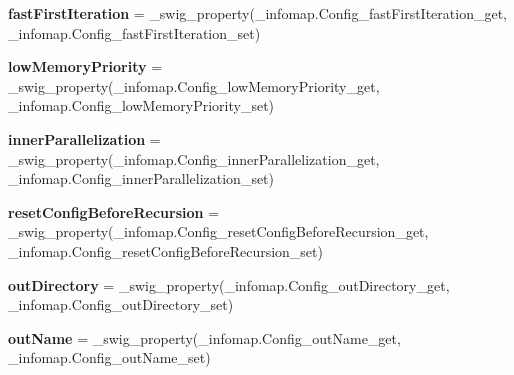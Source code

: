 \begin{DoxyCompactItemize}
\item 
\mbox{\label{classdsmacc_1_1graph_1_1infomap_1_1infomap_1_1Config_a741b590b3ae53b90e9a7013f815ce0cb}} 
{\bfseries fast\+First\+Iteration} = \+\_\+swig\+\_\+property(\+\_\+infomap.\+Config\+\_\+fast\+First\+Iteration\+\_\+get, \+\_\+infomap.\+Config\+\_\+fast\+First\+Iteration\+\_\+set)
\item 
\mbox{\label{classdsmacc_1_1graph_1_1infomap_1_1infomap_1_1Config_a8fdb503fe98bd18909a3e71795e10b2c}} 
{\bfseries low\+Memory\+Priority} = \+\_\+swig\+\_\+property(\+\_\+infomap.\+Config\+\_\+low\+Memory\+Priority\+\_\+get, \+\_\+infomap.\+Config\+\_\+low\+Memory\+Priority\+\_\+set)
\item 
\mbox{\label{classdsmacc_1_1graph_1_1infomap_1_1infomap_1_1Config_a6d0112314aa38f7d232d423dd6564438}} 
{\bfseries inner\+Parallelization} = \+\_\+swig\+\_\+property(\+\_\+infomap.\+Config\+\_\+inner\+Parallelization\+\_\+get, \+\_\+infomap.\+Config\+\_\+inner\+Parallelization\+\_\+set)
\item 
\mbox{\label{classdsmacc_1_1graph_1_1infomap_1_1infomap_1_1Config_ab1321796bd56f5a7271f139767cabbd0}} 
{\bfseries reset\+Config\+Before\+Recursion} = \+\_\+swig\+\_\+property(\+\_\+infomap.\+Config\+\_\+reset\+Config\+Before\+Recursion\+\_\+get, \+\_\+infomap.\+Config\+\_\+reset\+Config\+Before\+Recursion\+\_\+set)
\item 
\mbox{\label{classdsmacc_1_1graph_1_1infomap_1_1infomap_1_1Config_aa3dcff534c294885058e60a55288f465}} 
{\bfseries out\+Directory} = \+\_\+swig\+\_\+property(\+\_\+infomap.\+Config\+\_\+out\+Directory\+\_\+get, \+\_\+infomap.\+Config\+\_\+out\+Directory\+\_\+set)
\item 
\mbox{\label{classdsmacc_1_1graph_1_1infomap_1_1infomap_1_1Config_a9a2e9ac70b56a914be12924c31aa46e0}} 
{\bfseries out\+Name} = \+\_\+swig\+\_\+property(\+\_\+infomap.\+Config\+\_\+out\+Name\+\_\+get, \+\_\+infomap.\+Config\+\_\+out\+Name\+\_\+set)
\item 

\end{DoxyCompactItemize}
